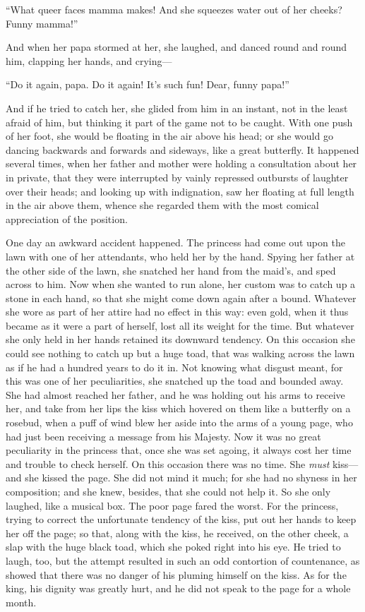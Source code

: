 \documentclass[12pt]{memoir}
\begin{document}
``What queer faces mamma makes!  And she squeezes water out of her
cheeks?  Funny mamma!''

And when her papa stormed at her, she laughed, and danced round and
round him, clapping her hands, and crying---

``Do it again, papa.  Do it again!  It's such fun!  Dear, funny
papa!''

And if he tried to catch her, she glided from him in an instant, not
in the least afraid of him, but thinking it part of the game not to be
caught.  With one push of her foot, she would be floating in the air
above his head; or she would go dancing backwards and forwards and
sideways, like a great butterfly.  It happened several times, when her
father and mother were holding a consultation about her in private,
that they were interrupted by vainly repressed outbursts of laughter
over their heads; and looking up with indignation, saw her floating at
full length in the air above them, whence she regarded them with the
most comical appreciation of the position.

One day an awkward accident happened.  The princess had come out upon
the lawn with one of her attendants, who held her by the hand.  Spying
her father at the other side of the lawn, she snatched her hand from
the maid's, and sped across to him.  Now when she wanted to run alone,
her custom was to catch up a stone in each hand, so that she might
come down again after a bound.  Whatever she wore as part of her
attire had no effect in this way: even gold, when it thus became as it
were a part of herself, lost all its weight for the time.  But
whatever she only held in her hands retained its downward tendency.
On this occasion she could see nothing to catch up but a huge toad,
that was walking across the lawn as if he had a hundred years to do it
in.  Not knowing what disgust meant, for this was one of her
peculiarities, she snatched up the toad and bounded away.  She had
almost reached her father, and he was holding out his arms to receive
her, and take from her lips the kiss which hovered on them like a
butterfly on a rosebud, when a puff of wind blew her aside into the
arms of a young page, who had just been receiving a message from his
Majesty.  Now it was no great peculiarity in the princess that, once
she was set agoing, it always cost her time and trouble to check
herself.  On this occasion there was no time.  She \emph{must}
kiss---and she kissed the page.  She did not mind it much; for she had
no shyness in her composition; and she knew, besides, that she could
not help it.  So she only laughed, like a musical box.  The poor page
fared the worst.  For the princess, trying to correct the unfortunate
tendency of the kiss, put out her hands to keep her off the page; so
that, along with the kiss, he received, on the other cheek, a slap
with the huge black toad, which she poked right into his eye.  He
tried to laugh, too, but the attempt resulted in such an odd
contortion of countenance, as showed that there was no danger of his
pluming himself on the kiss.  As for the king, his dignity was greatly
hurt, and he did not speak to the page for a whole month.
\end{document}
